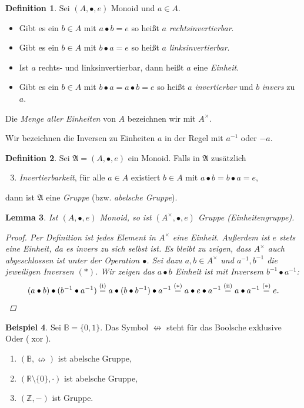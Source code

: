 \documentclass[11pt, a4paper]{article}
\theoremstyle{definition}
\newtheorem{definition}{Definition}[section]
\newtheorem{example}[definition]{Beispiel}
\theoremstyle{plain}
\newtheorem{lemma}[definition]{Lemma}
\numberwithin{equation}{section}
\DeclareMathOperator{\xor}{xor}
\begin{document}
\begin{definition}
	Sei $(A, \bullet, e)$ Monoid und $a \in A$.
	\begin{itemize}
		\item Gibt es ein $b \in A$ mit $a \bullet b = e$ so heißt $a$ \textit{rechtsinvertierbar}.
		\item Gibt es ein $b \in A$ mit $b \bullet a = e$ so heißt $a$ \textit{linksinvertierbar}.
		\item Ist $a$ rechts- und linksinvertierbar, dann heißt $a$ eine \textit{Einheit}.
		\item Gibt es ein $b \in A$ mit $b \bullet a = a \bullet b = e$ so heißt $a$ \textit{invertierbar} und $b$ \textit{invers} zu $a$. 
	\end{itemize}
	Die \textit{Menge aller Einheiten} von $A$ bezeichnen wir mit $A^\times$.
\end{definition}
Wir bezeichnen die Inversen zu Einheiten $a$ in der Regel mit $a^{-1}$ oder $-a$. 
\begin{definition}
	Sei $\mathfrak{A} = (A, \bullet, e)$ ein Monoid. Falls in $\mathfrak{A}$ zusätzlich
	\begin{enumerate}\setcounter{enumi}{2}
		\item \textit{Invertierbarkeit}, für alle $a \in A$ existiert $b \in A$ mit $a \bullet b = b \bullet a = e$, 
	\end{enumerate}
	dann ist $\mathfrak{A}$ eine \textit{Gruppe} (bzw. \textit{abelsche Gruppe}).
\end{definition}
\begin{lemma}
	Ist $(A, \bullet, e)$ Monoid, so ist $(A^\times, \bullet, e)$ Gruppe (Einheitengruppe).
	\begin{proof}
		Per Definition ist jedes Element in $A^\times$ eine Einheit. Außerdem ist $e$ stets eine Einheit, da es invers zu sich selbst ist. Es bleibt zu zeigen, dass $A^\times$ auch abgeschlossen ist unter der Operation $\bullet$. Sei dazu $a, b \in A^\times$ und $a^{-1}, b^{-1}$ die jeweiligen Inversen $(\ast)$. Wir zeigen das $a \bullet b$ Einheit ist mit Inversem $b^{-1} \bullet a^{-1}$:
		\[
			(a \bullet b) \bullet (b^{-1} \bullet a^{-1}) \overset{\text{(i)}}{=} a \bullet (b \bullet b^{-1}) \bullet a^{-1} \overset{(\ast)}{=} a \bullet e \bullet a^{-1} \overset{\text{(ii)}}{=} a \bullet a^{-1} \overset{(\ast)}{=} e. \qedhere
		\]
	\end{proof}
\end{lemma}
\begin{example}
	Sei $\mathbb{B} = \{ 0, 1 \}$. Das Symbol $\nleftrightarrow$ steht für das Boolsche exklusive Oder ($\xor$).
	\begin{enumerate}
		\item $(\mathbb{B}, \nleftrightarrow)$ ist abelsche Gruppe,
		\item $(\mathbb{R} \setminus \{ 0 \}, \cdot)$ ist abelsche Gruppe,
		\item $(\mathbb{Z}, -)$ ist Gruppe.
	\end{enumerate}
\end{example}
\end{document}
